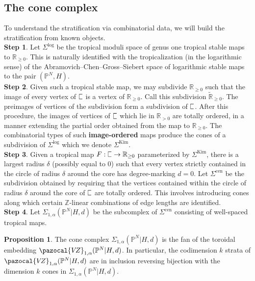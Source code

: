 \documentclass[11pt]{amsart}
\newcommand{\plC}{\scalebox{0.8}[1.3]{$\sqsubset$}}
\newcommand{\Z}{\mathbb{Z}}
\newcommand{\VZ}{\pazocal{V\!Z}}
\renewcommand{\to}{\rightarrow}
\newcommand{\RR}{\mathbb{R}}
\theoremstyle{definition}
\newtheorem{prop}[thm]{Proposition}
\theoremstyle{definition}
\begin{document}
\subsection{The cone complex} To understand the stratification via combinatorial data, we will build the stratification from known objects. \\

\noindent
\textbf{Step 1}. Let $\Sigma^{\mathrm{log}}$ be the tropical moduli space of genus one tropical stable maps to $\mathbb R_{\geq 0}$. This is naturally identified with the tropicalization (in the logarithmic sense) of the Abramovich--Chen--Gross--Siebert space of logarithmic stable maps to the pair $(\mathbb P^N,H)$. \\

\noindent
\textbf{Step 2}. Given such a tropical stable map, we may subdivide $\mathbb R_{\geq 0}$ such that the image of every vertex of $\plC$ is a vertex of $\mathbb R_{\geq 0}$. Call this subdivision $\widetilde{\mathbb R}_{\geq 0}$. The preimages of vertices of the subdivision form a subdivision of $\plC$. After this procedure, the images of vertices of $\plC$ which lie in $\RR_{>0}$ are totally ordered, in a manner extending the partial order obtained from the map to $\mathbb R_{\geq 0}$. The combinatorial types of such \textbf{image-ordered} maps produce the cones of a subdivision of $\Sigma^{\mathrm{log}}$ which we denote $\Sigma^{\mathrm{Kim}}$.\\

\noindent
\textbf{Step 3}. Given a tropical map $F: \plC\to \mathbb R_{\geq 0}$ parameterized by $\Sigma^{\mathrm{Kim}}$, there is a largest radius $\delta$ (possibly equal to $0$) such that every vertex strictly contained in the circle of radius $\delta$ around the core has degree-marking $d=0$. Let $
\Sigma^{\mathrm{cen}}$ be the subdivision obtained by requiring that the vertices contained within the circle of radius $\delta$ around the core of $\plC$ are totally ordered. This involves introducing cones along which certain $\Z$-linear combinations of edge lengths are identified.\\

\noindent
\textbf{Step 4}. Let $\Sigma_{1,\alpha}(\mathbb P^N|H,d)$ be the subcomplex of $\Sigma^{\mathrm{cen}}$ consisting of well-spaced tropical maps.

\begin{prop}
The cone complex $
\Sigma_{1,\alpha}(\mathbb P^N|H,d)$ is the fan of the toroidal embedding $
\VZ_{1,\alpha}(\mathbb P^N|H,d)$. In particular, the codimension $k$ strata of $
\VZ_{1,\alpha}(\mathbb P^N|H,d)$ are in inclusion reversing bijection with the dimension $k$ cones in $
\Sigma_{1,\alpha}(\mathbb P^N|H,d)$.
\end{prop}
\end{document}
